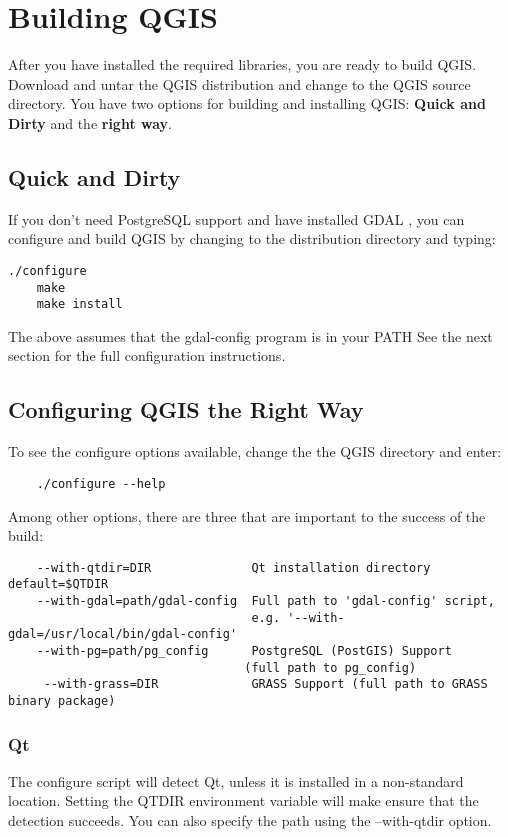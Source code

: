  \section{Building QGIS}
  
  After you have installed the required libraries, you are ready to build QGIS. Download and untar the QGIS distribution and change to the QGIS source directory. You have two options for building and installing QGIS: \textbf{Quick and Dirty} and the \textbf{right way}.
  \subsection{Quick and Dirty}
  If you don't need PostgreSQL support and have installed GDAL ,
  you can configure and build QGIS by changing to the distribution directory
  and typing:
  \begin{verbatim}./configure
    make
    make install
  \end{verbatim}
  The above assumes that the gdal-config program is in your PATH
  See the next section for the full configuration instructions.
  \subsection{Configuring QGIS the Right Way}
  To see the configure options available, change the the QGIS 
  directory and enter:
  \begin{verbatim}
    ./configure --help
   \end{verbatim}
  Among other options, there are three that are important to
  the success of the build:
  \begin{verbatim}
    --with-qtdir=DIR              Qt installation directory default=$QTDIR
    --with-gdal=path/gdal-config  Full path to 'gdal-config' script,
                                  e.g. '--with-gdal=/usr/local/bin/gdal-config'
    --with-pg=path/pg_config      PostgreSQL (PostGIS) Support
                                 (full path to pg_config)
     --with-grass=DIR             GRASS Support (full path to GRASS binary package)

  \end{verbatim}

  \subsubsection{Qt}
  The configure script will detect Qt, unless it is installed in a
  non-standard location. Setting the QTDIR environment variable will 
  make ensure that the detection succeeds. You can also specify the
  path using the --with-qtdir option. 
